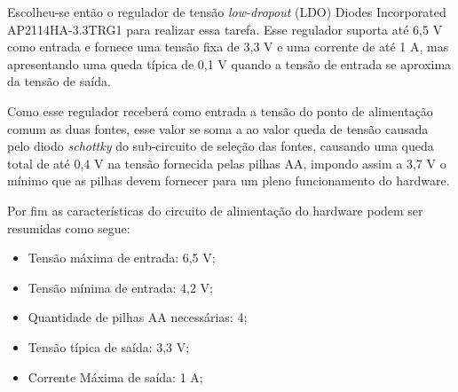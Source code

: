 Escolheu-se então o regulador de tensão \textit{low-dropout} (LDO) Diodes Incorporated AP2114HA-3.3TRG1 para realizar essa tarefa. Esse regulador suporta até 6,5 V como entrada e fornece uma tensão fixa de 3,3 V e uma corrente de até 1 A, mas apresentando uma queda típica de 0,1 V quando a tensão de entrada se aproxima da tensão de saída. 

Como esse regulador receberá como entrada a tensão do ponto de alimentação comum as duas fontes, esse valor se soma a ao valor queda de tensão causada pelo diodo \textit{schottky} do sub-circuito de seleção das fontes, causando uma queda total de até 0,4 V na tensão fornecida pelas pilhas AA, impondo assim a 3,7 V o mínimo que as pilhas devem fornecer para um pleno funcionamento do hardware. 


Por fim as características do circuito de alimentação do hardware podem ser resumidas como segue:

\begin{itemize}
    \item Tensão máxima de entrada: 6,5 V;
    \item Tensão mínima de entrada: 4,2 V;
    \item Quantidade de pilhas AA necessárias: 4;
    \item Tensão típica de saída: 3,3 V;
    \item Corrente Máxima de saída: 1 A;
\end{itemize}











